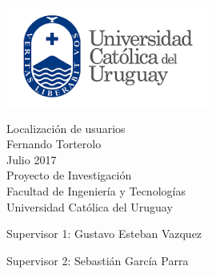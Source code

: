 \thispagestyle{empty}
\includegraphics[scale=0.5]{fig/logoUcu.png}
\mbox{}\\[6pc]
\begin{center}
\Huge{Localización de usuarios}\\[2pc]

\Large{Fernando Torterolo}\\[1pc]
\large{Julio 2017}\\[2pc]

Proyecto de Investigación\\
Facultad de Ingeniería y Tecnologías\\
Universidad Católica del Uruguay
\end{center}
\vfill

\noindent Supervisor 1: Gustavo Esteban Vazquez

\noindent Supervisor 2: Sebastián García Parra

